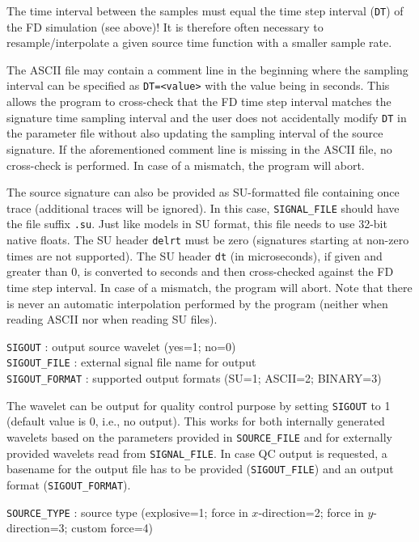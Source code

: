 The time interval between the samples must equal the time step interval (\texttt{DT}) of the FD simulation (see above)! It is therefore often necessary to resample/interpolate a given source time function with a smaller sample rate.

The ASCII file may contain a comment line in the beginning where the sampling interval can be specified as \texttt{DT=<value>} with the value being in seconds. This allows the program to cross-check that the FD time step interval matches the signature time sampling interval and the user does not accidentally modify \texttt{DT} in the parameter file without also updating the sampling interval of the source signature. If the aforementioned comment line is missing in the ASCII file, no cross-check is performed. In case of a mismatch, the program will abort.

The source signature can also be provided as SU-formatted file containing once trace (additional traces will be ignored). In this case, \texttt{SIGNAL\_FILE} should have the file suffix \texttt{.su}. Just like models in SU format, this file needs to use 32-bit native floats. The SU header \texttt{delrt} must be zero (signatures starting at non-zero times are not supported). The SU header \texttt{dt} (in microseconds), if given and greater than 0, is converted to seconds and then cross-checked against the FD time step interval. In case of a mismatch, the program will abort. Note that there is never an automatic interpolation performed by the program (neither when reading ASCII nor when reading SU files).

\texttt{SIGOUT} : output source wavelet (yes=1; no=0)\\
\texttt{SIGOUT\_FILE} : external signal file name for output\\
\texttt{SIGOUT\_FORMAT} : supported output formats (SU=1; ASCII=2; BINARY=3)

The wavelet can be output for quality control purpose by setting \texttt{SIGOUT} to 1 (default value is 0, i.e., no output). This works for both internally generated wavelets based on the parameters provided in \texttt{SOURCE\_FILE} and for externally provided wavelets read from \texttt{SIGNAL\_FILE}. In case QC output is requested, a basename for the output file has to be provided (\texttt{SIGOUT\_FILE}) and an output format (\texttt{SIGOUT\_FORMAT}).

\texttt{SOURCE\_TYPE} : source type (explosive=1; force in $x$-direction=2; force in $y$-direction=3; custom force=4)

